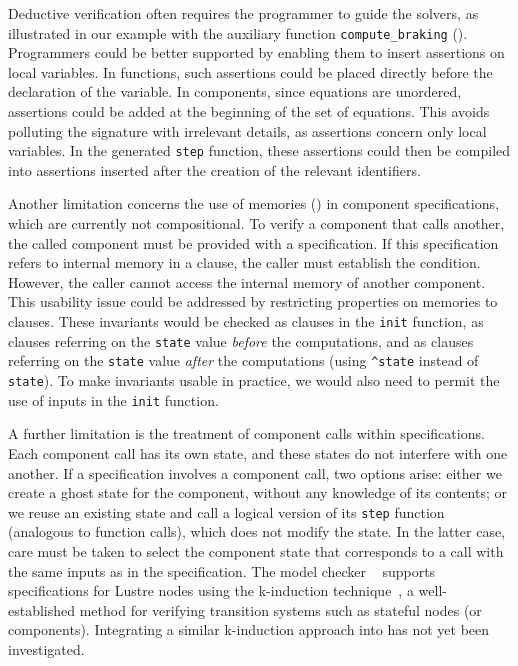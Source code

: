Deductive verification often requires the programmer to guide the solvers, as illustrated in our
example with the auxiliary function \verb|compute_braking| ().
Programmers could be better supported by enabling them to insert assertions on local variables. In
functions, such assertions could be placed directly before the declaration of the variable. In
components, since equations are unordered, assertions could be added at the beginning of the set of
equations. This avoids polluting the signature with irrelevant details, as assertions concern only
local variables. In the generated \texttt{step} function, these assertions could then be compiled
into \Creusot assertions inserted after the creation of the relevant identifiers.

Another limitation concerns the use of memories (\lastExpr{\ID}) in component specifications, which
are currently not compositional. To verify a component that calls another, the called component must
be provided with a specification. If this specification refers to internal memory in a
 clause, the caller must establish the condition. However, the caller cannot access
the internal memory of another component. This usability issue could be addressed by restricting
properties on memories to  clauses. These invariants would be checked as
 clauses in the \texttt{init} function, as  clauses referring on the
\texttt{state} value \emph{before} the computations, and as  clauses referring on the
\texttt{state} value \emph{after} the computations (using \verb|^state| instead of \texttt{state}).
To make invariants usable in practice, we would also need to permit the use of inputs in the
\texttt{init} function.

A further limitation is the treatment of component calls within specifications. Each component call
has its own state, and these states do not interfere with one another. If a specification involves a
component call, two options arise: either we create a ghost state for the component, without any
\apriori knowledge of its contents; or we reuse an existing state and call a logical version of its
\texttt{step} function (analogous to function calls), which does not modify the state. In the latter
case, care must be taken to select the component state that corresponds to a call with the same
inputs as in the specification. The model checker \Kind~\cite{DBLP:conf/cav/ChampionMST16} supports
specifications for Lustre nodes using the k-induction
technique~\cite{DBLP:conf/fmcad/SheeranSS00}, a well-established method for verifying transition
systems such as stateful nodes (or components). Integrating a similar k-induction approach into
\Creusot has not yet been investigated.
